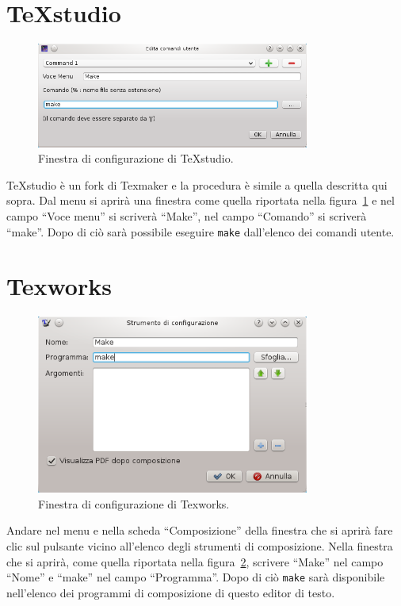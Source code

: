 \section{TeXstudio}
\label{sec:texstudio}

\begin{figure}
  \centering
  \includegraphics[width=0.8\textwidth]{figure/texstudio}
  \caption{Finestra di configurazione di TeXstudio.}
  \label{fig:texstudio}
\end{figure}
TeXstudio è un fork di Texmaker e la procedura è simile a quella descritta qui
sopra.  Dal menu  si aprirà
una finestra come quella riportata nella figura~\ref{fig:texstudio} e nel campo
``Voce menu'' si scriverà ``Make'', nel campo ``Comando'' si scriverà ``make''.
Dopo di ciò sarà possibile eseguire \texttt{make} dall'elenco dei comandi
utente.

\section{Texworks}
\label{sec:texworks}

\begin{figure}
  \centering
  \includegraphics[width=0.8\textwidth]{figure/texworks}
  \caption{Finestra di configurazione di Texworks.}
  \label{fig:texworks}
\end{figure}
Andare nel menu  e nella scheda ``Composizione''
della finestra che si aprirà fare clic sul pulsante \keys{{+}} vicino all'elenco
degli strumenti di composizione.  Nella finestra che si aprirà, come quella
riportata nella figura~\ref{fig:texworks}, scrivere ``Make'' nel campo ``Nome''
e ``make'' nel campo ``Programma''.  Dopo di ciò \texttt{make} sarà disponibile
nell'elenco dei programmi di composizione di questo editor di testo.

